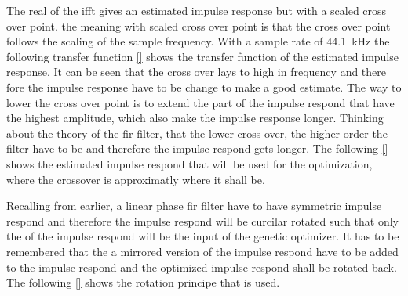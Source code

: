 The real of the \gls{ifft} gives an estimated impulse response but with a scaled cross over point. the meaning with scaled cross over point is that the cross over point follows the scaling of the sample frequency. With a sample rate of \SI{44.1}{\kilo\hertz} the following transfer function \autoref{} shows the transfer function of the estimated impulse response. It can be seen that the cross over lays to high in frequency and there fore the impulse response have to be change to make a good estimate. The way to lower the cross over point is to extend the part of the impulse respond that have the highest amplitude, which also make the impulse response longer. Thinking about the theory of the \gls{fir} filter, that the lower cross over, the higher order the filter have to be and therefore the impulse respond gets longer. The following \autoref{} shows the estimated impulse respond that will be used for the optimization, where the crossover is approximatly where it shall be. 







Recalling from earlier, a linear phase \gls{fir} filter have to have symmetric impulse respond and therefore the impulse respond will be curcilar rotated such that only the of the impulse respond will be the input of the genetic optimizer. It has to be remembered that the a mirrored version of the impulse respond have to be added to the impulse respond and the optimized impulse respond shall be rotated back. The following \autoref{} shows the rotation principe that is used.




 



